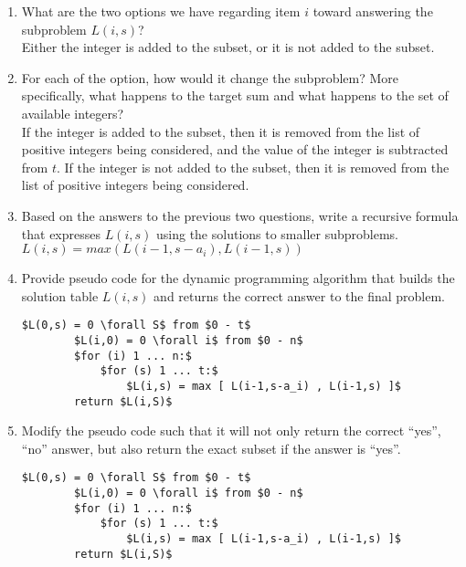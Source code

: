\documentclass[12pt]{article}
\begin{document}
\begin{enumerate}
    \item What are the two options we have regarding item $i$ toward answering the subproblem $L(i, s)$? \\
        Either the integer is added to the subset, or it is not added to the subset. 

    \item For each of the option, how would it change the subproblem? More
    specifically, what happens to the target sum and what happens to the set
    of available integers? \\
        If the integer is added to the subset, then it is removed from the list of positive integers being considered, and the value of the integer is subtracted from $t$.
        If the integer is not added to the subset, then it is removed from the list of positive integers being considered. 

    \item Based on the answers to the previous two questions, write a
    recursive formula that expresses $L(i, s)$ using the solutions to smaller
    subproblems.  \\
        $L(i, s) = max( L(i-1, s-a_i) , L(i-1, s) )$

    \item Provide pseudo code for the dynamic programming algorithm that
    builds the solution table $L(i, s)$ and returns the correct answer to
    the final problem.

    \begin{lstlisting}[mathescape]
        $L(0,s) = 0 \forall S$ from $0 - t$
        $L(i,0) = 0 \forall i$ from $0 - n$
        $for (i) 1 ... n:$
            $for (s) 1 ... t:$
                $L(i,s) = max [ L(i-1,s-a_i) , L(i-1,s) ]$
        return $L(i,S)$
    \end{lstlisting}
        
    \item Modify the pseudo code such that it will not only return the
    correct “yes”, “no” answer, but also return the exact subset if the
    answer is “yes”. \\

    \begin{lstlisting}[mathescape]
        $L(0,s) = 0 \forall S$ from $0 - t$
        $L(i,0) = 0 \forall i$ from $0 - n$
        $for (i) 1 ... n:$
            $for (s) 1 ... t:$
                $L(i,s) = max [ L(i-1,s-a_i) , L(i-1,s) ]$
        return $L(i,S)$
    \end{lstlisting}

\end{enumerate}
\end{document}
